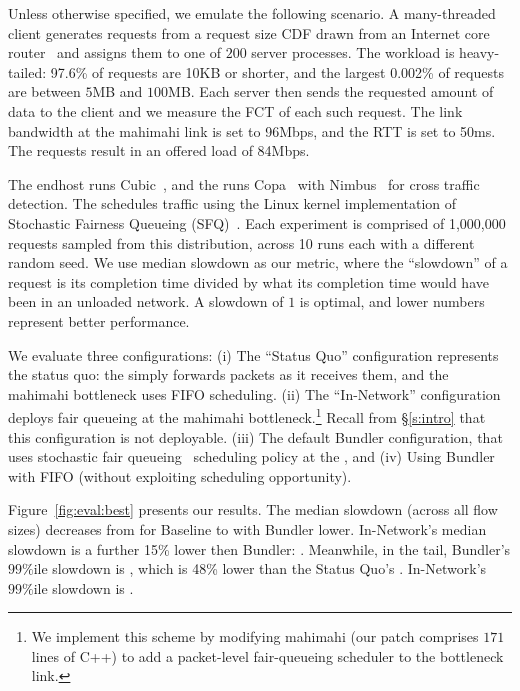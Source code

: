 Unless otherwise specified, we emulate the following scenario.
A many-threaded client generates requests from a request size CDF drawn from an Internet core router~\cite{caida-dataset} and assigns them to one of $200$ server processes.
The workload is heavy-tailed: 97.6\% of requests are 10KB or shorter, and the largest 0.002\% of requests are between $5$MB and $100$MB.
Each server then sends the requested amount of data to the client and we measure the FCT of each such request. 
The link bandwidth at the mahimahi link is set to 96Mbps, and the RTT is set to 50ms. The requests result in an offered load of 84Mbps. 

The endhost runs Cubic~\cite{cubic}, and the \inbox runs Copa~\cite{copa} with Nimbus~\cite{nimbus-arxiv} for cross traffic detection.
The \inbox schedules traffic using the Linux kernel implementation of Stochastic Fairness Queueing (SFQ)~\cite{sfq}.
Each experiment is comprised of 1,000,000 requests sampled from this distribution, across 10 runs each with a different random seed.
We use median slowdown as our metric, where the ``slowdown'' of a request is its completion time divided by what its completion time would have been in an unloaded network. A slowdown of $1$ is optimal, and lower numbers represent better performance.


\newcommand{\baseline}{Status Quo\xspace}
\newcommand{\optimal}{In-Network\xspace}

We evaluate three configurations: 
(i) The ``\baseline'' configuration represents the status quo: the \inbox simply forwards packets as it receives them, and the mahimahi bottleneck uses FIFO scheduling.
(ii) The ``\optimal'' configuration deploys fair queueing
at the mahimahi bottleneck.\footnote{
We implement this scheme by modifying mahimahi (our patch comprises $171$ lines of C++) to add a packet-level fair-queueing scheduler to the bottleneck link.}
Recall from \S\ref{s:intro} that this configuration is not deployable.
(iii) The default Bundler configuration, that uses stochastic fair queueing~\cite{sfq} scheduling policy at the \inbox, and (iv) Using Bundler with FIFO (without exploiting scheduling opportunity).

Figure~\ref{fig:eval:best} presents our results. 
The median slowdown (across all flow sizes) decreases from \overviewBenefitsBaselineMedian 
for Baseline to \overviewBenefitsBundlerMedian 
with Bundler \overviewBenefitsBundlerMedianImprovement
lower. 
\optimal's median slowdown is a further 15\% lower then Bundler: \overviewBenefitsOptimalMedian.
Meanwhile, in the tail, Bundler's $99\%$ile slowdown is \overviewBenefitsBundlerTail, which is 48\% lower than the \baseline's \overviewBenefitsBaselineTail. \optimal's $99\%$ile slowdown is \overviewBenefitsOptimalTail.
